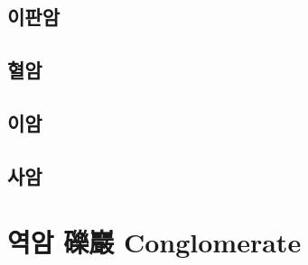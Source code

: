 \documentclass[12pt, a4paper, twoside]{book}
\begin{document}
	
	
	\clearpage
	\section{이판암}
	
	
	
	\clearpage
	\section{혈암}
	



	

	\clearpage
	\section{이암}







	
	
	
	\clearpage
	\section{사암}
	







	
	
	
	
	
	
	\clearpage
	\chapter{역암 礫巖 Conglomerate}
	\minitoc				%
	

	
	\clearpage
\end{document}
